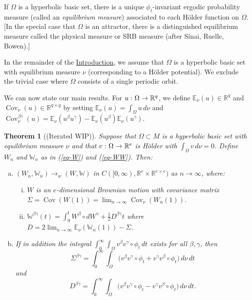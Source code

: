 \documentclass[aop,MSNbibl,seceqn,dvips]{arximspdf}
\newcommand{\eqref}[1]{(\ref{#1})}
\newtheorem{thmm}{Theorem}[section]
\newcommand{\R}{\mathbb{R}}
\newcommand{\E}{\mathbb{E}}
\newcommand{\BBW}{\mathbb{W}}
\newcommand{\Cov}{\operatorname{Cov}}
\begin{document}
If $\Omega$ is a hyperbolic basic set, there is a unique $\phi
_t$-invariant ergodic probability measure (called an \emph{equilibrium
measure}) associated to
each H\"older function on $\Omega$. [In the special case that $\Omega$
is an attractor, there is a distinguished equilibrium measure called
the physical measure or SRB measure (after Sinai, Ruelle, Bowen).]

In the remainder of the \hyperref[sec-intro]{Introduction}, we assume
that $\Omega$ is a
hyperbolic basic set
with equilibrium measure $\nu$ (corresponding to a H\"older potential).
We exclude the trivial case where $\Omega$ consists of a single
periodic orbit.

We can now state our main results.
For $u\dvtx\Omega\to\R^q$, we define $\E_\nu(u)\in\R^q$
and $\Cov_\nu(u)\in\R^{q\times q}$ by setting
$\E_\nu(u)=\int_\Omega u \,d\nu$ and
$\Cov_\nu^{\beta\gamma}(u)=\E_\nu(u^\beta u^\gamma)-\E_\nu
(u^\beta)\E
_\nu(u^\gamma)$.

\begin{thmm}[(Iterated WIP)] \label{thmm-WW}
Suppose that $\Omega\subset M$ is a hyperbolic basic set with
equilibrium measure $\nu$ and that $v\dvtx\Omega\to\R^e$ is H\"
older with
$\int_\Omega v \,d\nu=0$.
Define $W_n$ and $\BBW_n$ as in \eqref{eq-W} and \eqref{eq-WW}. Then:
%
\begin{enumerate}[(a)]
%
\item[(a)]
$(W_n,\BBW_n)\to_w (W,\BBW)$ in
$C([0,\infty),\R^e\times\R^{e\times e})$ as $n\to\infty$, where:
%
\begin{enumerate}[(ii)]
%
\item[(i)]
$W$ is an $e$-dimensional
Brownian motion with covariance matrix $\Sigma=\Cov(W(1))=\lim_{n\to
\infty}\Cov_\nu(W_n(1))$.
%
\item[(ii)]
$\BBW^{\beta\gamma}(t)=\int_0^t W^\beta\circ dW^\gamma+ \frac{1}2
D^{\beta\gamma}t$
where $D=2\lim_{n\to\infty}\E_\nu(\BBW_n(1))-\Sigma$.
\end{enumerate}
%
\item[(b)] If in addition the integral
$\int_0^\infty\int_{\Omega}v^\beta v^\gamma\circ\phi_t \,dt$ exists
for all $\beta,\gamma$, then
%
\[
\Sigma^{\beta\gamma}= \int_0^\infty\int
_\Omega\bigl(v^\beta v^\gamma\circ
\phi_t+ v^\gamma v^\beta\circ\phi_t
\bigr) \,d\nu \,dt
\]
%
and
%
\[
D^{\beta\gamma}= \int_0^\infty\int
_\Omega\bigl(v^\beta v^\gamma\circ
\phi_t- v^\gamma v^\beta\circ\phi_t
\bigr) \,d\nu \,dt.
\]
%
\end{enumerate}
%
\end{thmm}
\end{document}
